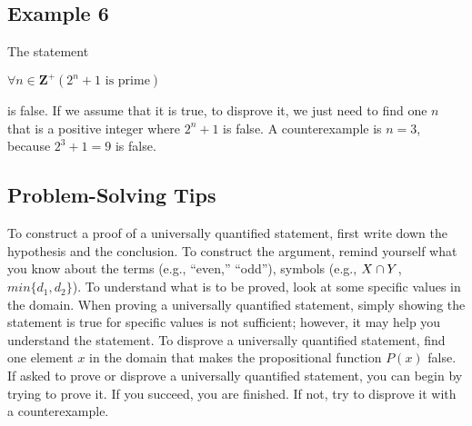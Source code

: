 \subsection*{Example 6}

The statement
\begin{center}
    $\forall n \in \textbf{Z}^+ (2^n + 1 \text{ is prime})$
\end{center}

is false.  If we assume that it is true, to disprove it, we just need to find one $n$ that is a positive integer where $2^n + 1$ is false.  A counterexample is $n = 3$, because $2^3 + 1 = 9$ is false.

\subsection*{Problem-Solving Tips}

To construct a proof of a universally quantified statement, first write down the hypothesis and the conclusion.  To construct the argument, remind yourself what you know about the terms (e.g., ``even,'' ``odd''), symbols (e.g., $X \cap Y$, $min\{d_1, d_2\}$).  To understand what is to be proved, look at some specific values in the domain.  When proving a universally quantified statement, simply showing the statement is true for specific values is not sufficient; however, it may help you understand the statement.  To disprove a universally quantified statement, find one element $x$ in the domain that makes the propositional function $P(x)$ false.  If asked to prove or disprove a universally quantified statement, you can begin by trying to prove it.  If you succeed, you are finished.  If not, try to disprove it with a counterexample.

\clearpage